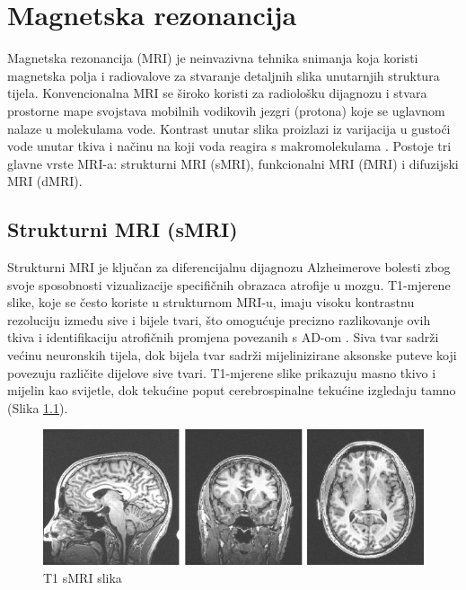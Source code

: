 \documentclass[zavrsnirad,upload]{fer}
\begin{document}
\label{pog:glavni_dio}

\chapter{Magnetska rezonancija}

Magnetska rezonancija (MRI) je neinvazivna tehnika snimanja koja koristi magnetska polja i radiovalove za stvaranje detaljnih slika unutarnjih struktura tijela. Konvencionalna MRI se široko koristi za radiološku dijagnozu i stvara prostorne mape svojstava mobilnih vodikovih jezgri (protona) koje se uglavnom nalaze u molekulama vode. Kontrast unutar slika proizlazi iz varijacija u gustoći vode unutar tkiva i načinu na koji voda reagira s makromolekulama \cite{Gore2003}. Postoje tri glavne vrste MRI-a: strukturni MRI (sMRI), funkcionalni MRI (fMRI) i difuzijski MRI (dMRI).


\section{Strukturni MRI (sMRI)}
Strukturni MRI je ključan za diferencijalnu dijagnozu Alzheimerove bolesti zbog svoje sposobnosti vizualizacije specifičnih obrazaca atrofije u mozgu. T1-mjerene slike, koje se često koriste u strukturnom MRI-u, imaju visoku kontrastnu rezoluciju između sive i bijele tvari, što omogućuje precizno razlikovanje ovih tkiva i identifikaciju atrofičnih promjena povezanih s AD-om \cite{Gonuguntla2022}. Siva tvar sadrži većinu neuronskih tijela, dok bijela tvar sadrži mijelinizirane aksonske puteve koji povezuju različite dijelove sive tvari. T1-mjerene slike prikazuju masno tkivo i mijelin kao svijetle, dok tekućine poput cerebrospinalne tekućine izgledaju tamno (Slika \ref{fig:sMRI_T1}).

\begin{figure}[h]
	\centering
	\includegraphics[width=1\textwidth]{Figures/T1_sMRI.png}
	\caption{T1 sMRI slika \cite{ucsd2021}}
	\label{fig:sMRI_T1}
\end{figure}
\end{document}
